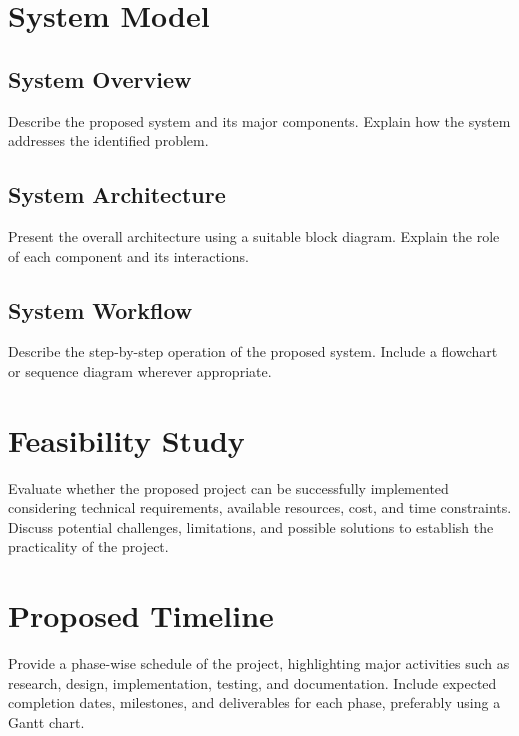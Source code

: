 \documentclass[12pt,a4paper]{report}
\begin{document}
\chapter{System Model}

\section{System Overview}
Describe the proposed system and its major components.
Explain how the system addresses the identified problem.

\section{System Architecture}
Present the overall architecture using a suitable block diagram.
Explain the role of each component and its interactions.

\section{System Workflow}
Describe the step-by-step operation of the proposed system.
Include a flowchart or sequence diagram wherever appropriate.

\chapter{Feasibility Study}
Evaluate whether the proposed project can be successfully implemented considering technical requirements, available resources, cost, and time constraints.
Discuss potential challenges, limitations, and possible solutions to establish the practicality of the project.

\chapter{Proposed Timeline}
Provide a phase-wise schedule of the project, highlighting major activities such as research, design, implementation, testing, and documentation.
Include expected completion dates, milestones, and deliverables for each phase, preferably using a Gantt chart.
\end{document}
